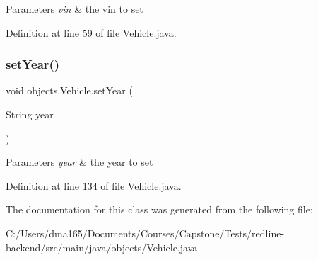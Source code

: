 \begin{DoxyParams}{Parameters}
{\em vin} & the vin to set \\
\hline
\end{DoxyParams}


Definition at line 59 of file Vehicle.\+java.


\begin{DoxyCode}{0}

\end{DoxyCode}
\mbox{\label{classobjects_1_1_vehicle_a40c1dc146931158d6f525730ee16be29}} 
\subsubsection{\texorpdfstring{setYear()}{setYear()}}
{\footnotesize\ttfamily void objects.\+Vehicle.\+set\+Year (\begin{DoxyParamCaption}\item[{String}]{year }\end{DoxyParamCaption})}


\begin{DoxyParams}{Parameters}
{\em year} & the year to set \\
\hline
\end{DoxyParams}


Definition at line 134 of file Vehicle.\+java.


\begin{DoxyCode}{0}

\end{DoxyCode}


The documentation for this class was generated from the following file\+:\begin{DoxyCompactItemize}
\item 
C\+:/\+Users/dma165/\+Documents/\+Courses/\+Capstone/\+Tests/redline-\/backend/src/main/java/objects/Vehicle.\+java\end{DoxyCompactItemize}
